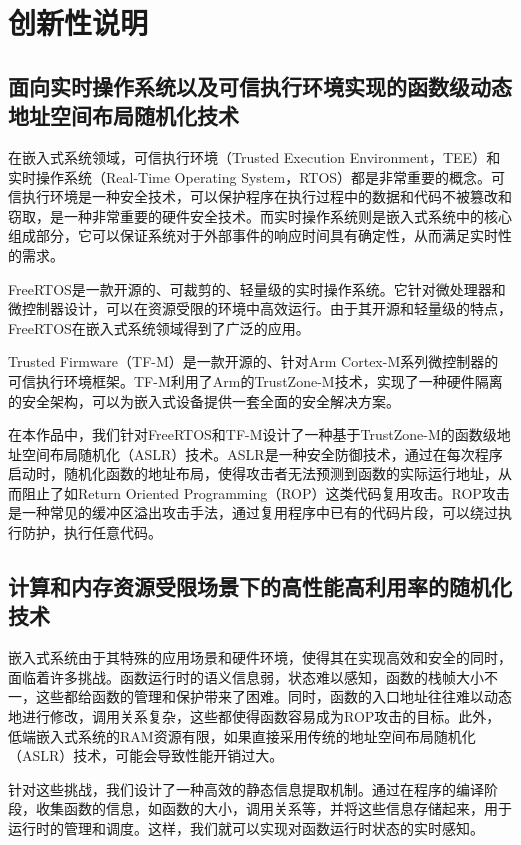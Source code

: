 \documentclass[UTF8,12pt,a4paper,twoside]{ctexart}
\numberwithin{figure}{section}
\begin{document}
\section{创新性说明}
\subsection{面向实时操作系统以及可信执行环境实现的函数级动态地址空间布局随机化技术}
\par 在嵌入式系统领域，可信执行环境（Trusted Execution Environment，TEE）和实时操作系统（Real-Time Operating System，RTOS）都是非常重要的概念。可信执行环境是一种安全技术，可以保护程序在执行过程中的数据和代码不被篡改和窃取，是一种非常重要的硬件安全技术。而实时操作系统则是嵌入式系统中的核心组成部分，它可以保证系统对于外部事件的响应时间具有确定性，从而满足实时性的需求。

\par FreeRTOS是一款开源的、可裁剪的、轻量级的实时操作系统。它针对微处理器和微控制器设计，可以在资源受限的环境中高效运行。由于其开源和轻量级的特点，FreeRTOS在嵌入式系统领域得到了广泛的应用。

\par Trusted Firmware（TF-M）是一款开源的、针对Arm Cortex-M系列微控制器的可信执行环境框架。TF-M利用了Arm的TrustZone-M技术，实现了一种硬件隔离的安全架构，可以为嵌入式设备提供一套全面的安全解决方案。

\par 在本作品中，我们针对FreeRTOS和TF-M设计了一种基于TrustZone-M的函数级地址空间布局随机化（ASLR）技术。ASLR是一种安全防御技术，通过在每次程序启动时，随机化函数的地址布局，使得攻击者无法预测到函数的实际运行地址，从而阻止了如Return Oriented Programming（ROP）这类代码复用攻击。ROP攻击是一种常见的缓冲区溢出攻击手法，通过复用程序中已有的代码片段，可以绕过执行防护，执行任意代码。

\subsection{计算和内存资源受限场景下的高性能高利用率的随机化技术}
\par 嵌入式系统由于其特殊的应用场景和硬件环境，使得其在实现高效和安全的同时，面临着许多挑战。函数运行时的语义信息弱，状态难以感知，函数的栈帧大小不一，这些都给函数的管理和保护带来了困难。同时，函数的入口地址往往难以动态地进行修改，调用关系复杂，这些都使得函数容易成为ROP攻击的目标。此外，低端嵌入式系统的RAM资源有限，如果直接采用传统的地址空间布局随机化（ASLR）技术，可能会导致性能开销过大。

\par 针对这些挑战，我们设计了一种高效的静态信息提取机制。通过在程序的编译阶段，收集函数的信息，如函数的大小，调用关系等，并将这些信息存储起来，用于运行时的管理和调度。这样，我们就可以实现对函数运行时状态的实时感知。
\end{document}
